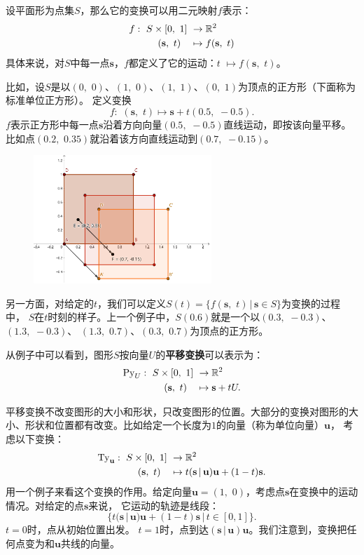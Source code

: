 \documentclass[12pt,UTF8]{ctexbook}
\begin{document}
设平面形为点集$S$，那么它的变换可以用二元映射$f$表示：
\begin{align}
    f: \,\, S\times[0,\,\,1] \,\,&\rightarrow \mathbb{R}^2 \notag \\
    (\mathbf{s},\,\, t) \quad &\mapsto f(\mathbf{s},\,\,t) \notag
\end{align}
具体来说，对$S$中每一点$\mathbf{s}$，$f$都定义了它的运动：$t\,\,\mapsto f(\mathbf{s},\,\,t)$。

比如，设$S$是以$(0,\,\,0)$、$(1,\,\,0)$、$(1,\,\,1)$、$(0,\,\,1)$为顶点的正方形（下面称为标准单位正方形）。
定义变换
$$f:\,\, (\mathbf{s}, \,\,t) \mapsto \mathbf{s} + t(0.5, \,\, -0.5). $$
$f$表示正方形中每一点$\mathbf{s}$沿着方向向量$(0.5, \,\, -0.5)$直线运动，即按该向量平移。
比如点$(0.2,\,\,0.35)$就沿着该方向直线运动到$(0.7, \,\,-0.15)$。

\begin{figure}[h] %
    \vspace{4pt}
    \centering
    \includegraphics[width=0.6\textwidth]{平移变换例1.png}
\end{figure}

另一方面，对给定的$t$，我们可以定义$S(t) = \{f(\mathbf{s},\,\,t) \, | \, \mathbf{s}\in S\}$为变换的过程中，
$S$在$t$时刻的样子。上一个例子中，$S(0.6)$就是一个以$(0.3,\,\,-0.3)$、$(1.3,\,\,-0.3)$、
$(1.3,\,\,0.7)$、$(0.3,\,\,0.7)$为顶点的正方形。

从例子中可以看到，图形$S$按向量$U$的\textbf{平移变换}可以表示为：
\begin{align}
    \mathrm{Py}_U: \,\, S\times[0,\,\,1] \,\,&\rightarrow \mathbb{R}^2 \notag \\
    (\mathbf{s},\,\, t) \quad &\mapsto \mathbf{s} + tU. \notag
\end{align}

平移变换不改变图形的大小和形状，只改变图形的位置。大部分的变换对图形的大小、形状和位置都有改变。比如给定一个长度为$1$的向量（称为单位向量）$\mathbf{u}$，
考虑以下变换：
\begin{align}
    \mathrm{Ty}_\mathbf{u}: \,\, S\times[0,\,\,1] \,\,&\rightarrow \mathbb{R}^2 \notag \\
    (\mathbf{s},\,\, t) \quad &\mapsto t(\mathbf{s}\,|\,\mathbf{u})\mathbf{u} + (1 - t)\mathbf{s}. \notag
\end{align}
用一个例子来看这个变换的作用。给定向量$\mathbf{u} = (1,\,\,0)$，考虑点$\mathbf{s}$在变换中的运动情况。对给定的点$\mathbf{s}$来说，
它运动的轨迹是线段：
$$\{t(\mathbf{s}\,|\,\mathbf{u})\mathbf{u} + (1 - t)\mathbf{s} \, | \, t\in[0,1]\}.$$
$t=0$时，点从初始位置出发。
$t=1$时，点到达$(\mathbf{s}\,|\,\mathbf{u})\mathbf{u}$。我们注意到，变换把任何点变为和$\mathbf{u}$共线的向量。
\end{document}
